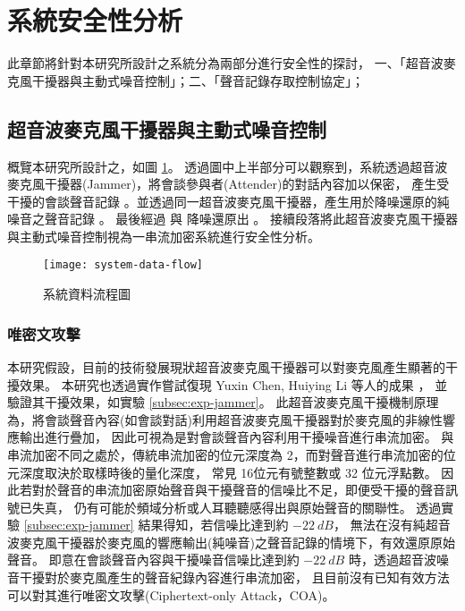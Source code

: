 \section{系統安全性分析}\label{sec:analysis}

    此章節將針對本研究所設計之系統分為兩部分進行安全性的探討，
一、「超音波麥克風干擾器與主動式噪音控制」；二、「聲音記錄存取控制協定」；


\subsection{超音波麥克風干擾器與主動式噪音控制}

    概覽本研究所設計之，如圖 \ref{fig:system-data-flow}。
透過圖中上半部分可以觀察到，系統透過超音波麥克風干擾器(Jammer)，將會談參與者(Attender)的對話內容加以保密，
產生受干擾的會談聲音記錄 \DEFrecJ。並透過同一超音波麥克風干擾器，產生用於降噪還原的純噪音之聲音記錄 \DEFrecN。
最後經過 \DEFfuncEstm{} 與 \DEFfuncAnc{} 降噪還原出 \DEFrecREV。
接續段落將此超音波麥克風干擾器與主動式噪音控制視為一串流加密系統進行安全性分析。

\begin{figure}[H]
    \centering
    \texttt{[image: system-data-flow]}
    \caption{系統資料流程圖}\label{fig:system-data-flow}
\end{figure}


\subsubsection{唯密文攻擊}

    本研究假設，目前的技術發展現狀超音波麥克風干擾器可以對麥克風產生顯著的干擾效果\cite{chen2020demonstrating}。
本研究也透過實作嘗試復現 Yuxin Chen, Huiying Li 等人的成果 \cite{chen2020wearable}，
並驗證其干擾效果，如實驗 \ref{subsec:exp-jammer}。
此超音波麥克風干擾機制原理為，將會談聲音內容(如會談對話)利用超音波麥克風干擾器對於麥克風的非線性響應輸出進行疊加，
因此可視為是對會談聲音內容利用干擾噪音進行串流加密。
與串流加密不同之處於，傳統串流加密的位元深度為 2，而對聲音進行串流加密的位元深度取決於取樣時後的量化深度，
常見 16位元有號整數或 32 位元浮點數。
因此若對於聲音的串流加密原始聲音與干擾聲音的信噪比不足，即便受干擾的聲音訊號已失真，
仍有可能於頻域分析或人耳聽聽感得出與原始聲音的關聯性。
透過實驗 \ref{subsec:exp-jammer} 結果得知，若信噪比達到約 $-22~dB$，
無法在沒有純超音波麥克風干擾器於麥克風的響應輸出(純噪音)之聲音記錄的情境下，有效還原原始聲音。
即意在會談聲音內容與干擾噪音信噪比達到約 $-22~dB$ 時，透過超音波噪音干擾對於麥克風產生的聲音紀錄內容進行串流加密，
且目前沒有已知有效方法可以對其進行唯密文攻擊(Ciphertext-only Attack，COA)。


